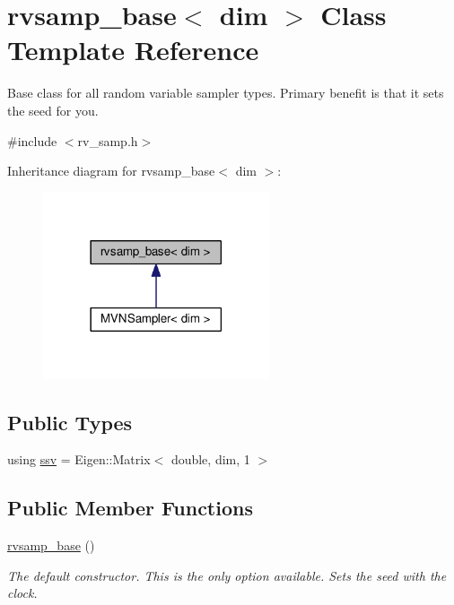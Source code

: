 \hypertarget{classrvsamp__base}{}\section{rvsamp\+\_\+base$<$ dim $>$ Class Template Reference}
\label{classrvsamp__base}


Base class for all random variable sampler types. Primary benefit is that it sets the seed for you.  




{\ttfamily \#include $<$rv\+\_\+samp.\+h$>$}



Inheritance diagram for rvsamp\+\_\+base$<$ dim $>$\+:\nopagebreak
\begin{figure}[H]
\begin{center}
\leavevmode
\includegraphics[width=189pt]{classrvsamp__base__inherit__graph}
\end{center}
\end{figure}
\subsection*{Public Types}
\begin{DoxyCompactItemize}
\item 
using \hyperlink{classrvsamp__base_a744275f57e806e6c787e331241b306eb}{ssv} = Eigen\+::\+Matrix$<$ double, dim, 1 $>$
\end{DoxyCompactItemize}
\subsection*{Public Member Functions}
\begin{DoxyCompactItemize}
\item 
\hyperlink{classrvsamp__base_a57fd1e9639c741bf464555756840daf2}{rvsamp\+\_\+base} ()\hypertarget{classrvsamp__base_a57fd1e9639c741bf464555756840daf2}{}\label{classrvsamp__base_a57fd1e9639c741bf464555756840daf2}

\begin{DoxyCompactList}\small\item\em The default constructor. This is the only option available. Sets the seed with the clock. \end{DoxyCompactList}\end{DoxyCompactItemize}
